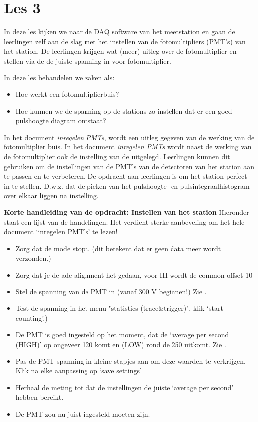 \section{Les 3}

In deze les kijken we naar de DAQ software van het meetstation en gaan de leerlingen
zelf aan de slag met het instellen van de fotomultipliers (PMT's) van het station.
De leerlingen krijgen wat (meer) uitleg over de fotomultiplier en stellen via de \hisparc \daq
de juiste spanning in voor fotomultiplier.

In deze les behandelen we zaken als:
\begin{itemize}
    \item Hoe werkt een fotomultiplierbuis? 
    \item Hoe kunnen we de spanning op de stations zo instellen dat er een
    goed pulshoogte diagram ontstaat?
\end{itemize}

In het document \textit{inregelen PMTs}, wordt een uitleg gegeven van de
werking van de fotomultiplier buis. In het document \textit{inregelen
PMTs} wordt naast de werking van de fotomultiplier ook de instelling van
de \hisparc \daq uitgelegd. Leerlingen kunnen dit gebruiken om de
instellingen van de PMT's van de detectoren van het \hisparc station aan
te passen en te verbeteren. De opdracht aan leerlingen is om het station perfect 
in te stellen. D.w.z. dat de pieken van het pulshoogte- en pulsintegraalhistogram
over elkaar liggen na instelling.

\textbf{Korte handleiding van de opdracht: Instellen van het station} Hieronder staat een lijst van de handelingen. 
Het verdient sterke aanbeveling om het hele document `inregelen PMT's' te lezen!

\begin{itemize}
    \item Zorg dat de \daq mode stopt. (dit betekent dat er geen data meer wordt verzonden.)
    \item Zorg dat je de adc alignment het gedaan, voor \hisparc III \daq wordt de common offset
    10
    \item Stel de spanning van de PMT in (vanaf 300 V beginnen!) Zie .
    \item Test de spanning in het menu "statistics (trace\&trigger)", klik `start counting'.)
    \item De PMT is goed ingesteld op het moment, dat de `average per second (HIGH)' 
    op ongeveer 120 komt en (LOW) rond de 250 uitkomt. Zie .
    \item Pas de PMT spanning in kleine stapjes aan om deze waarden te verkrijgen. Klik na elke aanpassing op `save settings'
    \item Herhaal de meting tot dat de instellingen de juiste `average per second' hebben bereikt.
    \item De PMT zou nu juist ingesteld moeten zijn. 
\end{itemize}


